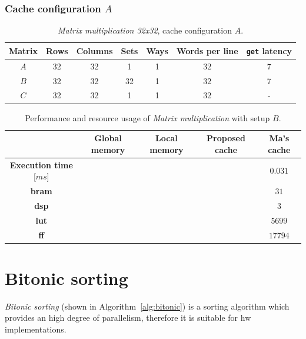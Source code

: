 \documentclass[11pt,a4paper,oneside]{memoir}
\begin{document}
\subsubsection{Cache configuration $A$}
\begin{table}[!htb]
	\begin{center}
		\begin{tabular}{ccccccc}
			\hline
			\rowcolor{gray!50}
			\textbf{Matrix} & \textbf{Rows} & \textbf{Columns} &
			\textbf{Sets} & \textbf{Ways} & \textbf{Words per line}
			& \textbf{\texttt{get} latency} \\
			\hline
			$A$ & 32 & 32 & 1 & 1 & 32 & 7 \\
			\rowcolor{gray!25}
			$B$ & 32 & 32 & 32 & 1 & 32 & 7 \\
			$C$ & 32 & 32 & 1 & 1 & 32 & - \\
			\hline
		\end{tabular}
	\end{center}
	\caption{\emph{Matrix multiplication 32x32}, cache configuration $A$.}
	\label{tab:matmul_32_config_a}
\end{table}

\begin{table}[!htb]
	\begin{center}
		\begin{tabularx}{\textwidth}{CCCCC}
			\hline
			& \textbf{Global memory} & \textbf{Local memory} &
			\textbf{Proposed cache} & \textbf{Ma's cache} \\
			\hline
			\textbf{Execution time} [$ms$] & & & & $0.031$ \\
			\textbf{\ac{bram}} & & & & $31$ \\
			\textbf{\acs{dsp}} & & & & $3$ \\
			\textbf{\acs{lut}} & & & & $5699$ \\
			\textbf{\acs{ff}} & & & & $17794$ \\
			\hline
		\end{tabularx}
	\end{center}
	\caption{Performance and resource usage of \emph{Matrix multiplication}
	with setup $B$.}
	\label{tab:matmul_report_b}
\end{table}

\section{Bitonic sorting}
\emph{Bitonic sorting} (shown in Algorithm~\ref{alg:bitonic}) is a sorting
algorithm which provides an high degree of parallelism, therefore it is
suitable for \acl{hw} implementations.
\end{document}
